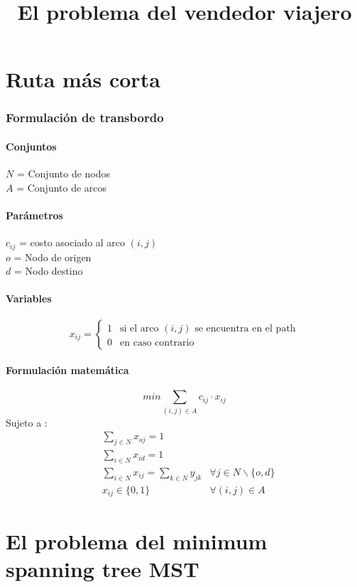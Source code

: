 \documentclass{article}
\title{El problema del vendedor viajero}
\numberwithin{equation}{section}
\begin{document}
\part{Ruta más corta}
\section{Formulación de transbordo}
\subsection{Conjuntos}
$N$ = Conjunto de nodos\\
$A$ = Conjunto de arcos
\subsection{Parámetros}
$c_{ij}$ = costo asociado al arco $(i,j)$\\
$o$ = Nodo de origen\\
$d$ = Nodo destino
\subsection{Variables}
\begin{flushleft}
\[x_{ij}={\begin{cases}1&{\mbox{si el arco $(i,j)$ se encuentra en el path}}\\0&{\mbox{en caso contrario}}\end{cases}}
\]
\end{flushleft}
\subsection{Formulación matemática}
\begin{equation}
min \sum_{(i,j) \in A} c_{ij} \cdot x_{ij}
\end{equation}
Sujeto a : \begin{align}
& \sum_{j \in N} x_{oj} = 1 \\
& \sum_{i \in N} x_{id} = 1 \\
& \sum_{i \in N} x_{ij} = \sum_{k \in N} y_{jk} &\forall j \in N \backslash \{o,d\} \\
& x_{ij} \in \{0,1\} &\forall (i,j) \in A
\end{align}




\newpage
\part{El problema del minimum spanning tree MST}
\end{document}
